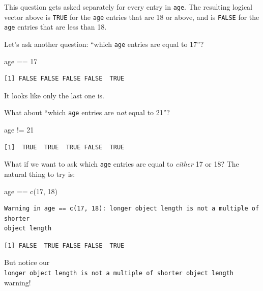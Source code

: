 \documentclass[
  letterpaper,
  DIV=11,
  numbers=noendperiod]{scrreprt}
\newenvironment{Shaded}{\begin{snugshade}}{\end{snugshade}}
\newcommand{\DecValTok}[1]{\textcolor[rgb]{0.68,0.00,0.00}{#1}}
\newcommand{\FunctionTok}[1]{\textcolor[rgb]{0.28,0.35,0.67}{#1}}
\newcommand{\NormalTok}[1]{\textcolor[rgb]{0.00,0.23,0.31}{#1}}
\newcommand{\SpecialCharTok}[1]{\textcolor[rgb]{0.37,0.37,0.37}{#1}}
\begin{document}
This question gets asked separately for every entry in \texttt{age}. The
resulting logical vector above is \texttt{TRUE} for the \texttt{age}
entries that are 18 or above, and is \texttt{FALSE} for the \texttt{age}
entries that are less than 18.

Let's ask another question: ``which \texttt{age} entries are equal to
17''?

\begin{Shaded}
\begin{Highlighting}[]
\NormalTok{age }\SpecialCharTok{==} \DecValTok{17}
\end{Highlighting}
\end{Shaded}

\begin{verbatim}
[1] FALSE FALSE FALSE FALSE  TRUE
\end{verbatim}

It looks like only the last one is.

What about ``which \texttt{age} entries are \emph{not} equal to 21''?

\begin{Shaded}
\begin{Highlighting}[]
\NormalTok{age }\SpecialCharTok{!=} \DecValTok{21}
\end{Highlighting}
\end{Shaded}

\begin{verbatim}
[1]  TRUE  TRUE  TRUE FALSE  TRUE
\end{verbatim}

What if we want to ask which \texttt{age} entries are equal to
\emph{either} 17 or 18? The natural thing to try is:

\begin{Shaded}
\begin{Highlighting}[]
\NormalTok{age }\SpecialCharTok{==} \FunctionTok{c}\NormalTok{(}\DecValTok{17}\NormalTok{, }\DecValTok{18}\NormalTok{)}
\end{Highlighting}
\end{Shaded}

\begin{verbatim}
Warning in age == c(17, 18): longer object length is not a multiple of shorter
object length
\end{verbatim}

\begin{verbatim}
[1] FALSE  TRUE FALSE FALSE  TRUE
\end{verbatim}

But notice our
\texttt{longer\ object\ length\ is\ not\ a\ multiple\ of\ shorter\ object\ length}
warning!
\end{document}
